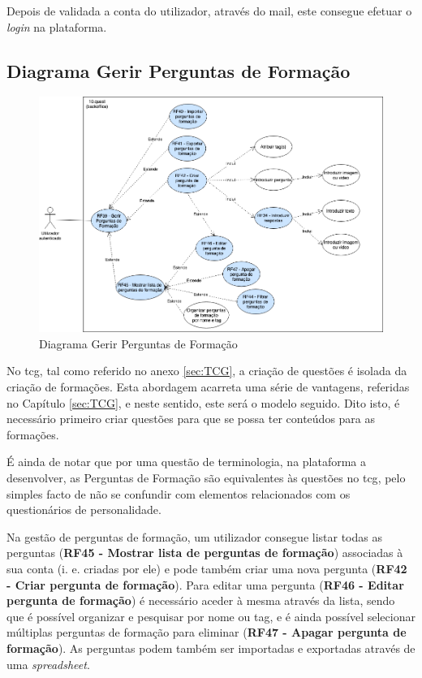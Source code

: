 Depois de validada a conta do utilizador, através do mail, este consegue efetuar o \textit{login} na plataforma.



\newpage

\subsection{Diagrama Gerir Perguntas de Formação}
\label{d:perguntastcg}
\begin{figure}[ht!]
	\begin{center}
		\includegraphics[width=1\textwidth]{img/rf/gerir-perguntas-tcg}
		\caption{Diagrama Gerir Perguntas de Formação}
		\label{fig:rf-gerir-perguntas-tcg}
	\end{center}
\end{figure}

No \acrshort{tcg}, tal como referido no anexo \ref{sec:TCG}, a criação de questões é isolada da criação de formações. Esta abordagem acarreta uma série de vantagens, referidas no Capítulo \ref{sec:TCG}, e neste sentido, este será o modelo seguido. Dito isto, é necessário primeiro criar questões para que se possa ter conteúdos para as formações. 

É ainda de notar que por uma questão de terminologia, na plataforma a desenvolver, as Perguntas de Formação são equivalentes às questões no \acrshort{tcg}, pelo simples facto de não se confundir com elementos relacionados com os questionários de personalidade.

Na gestão de perguntas de formação, um utilizador consegue listar todas as perguntas (\textbf{RF45 - Mostrar lista de perguntas de formação}) associadas à sua conta (i. e. criadas por ele) e pode também criar uma nova pergunta (\textbf{RF42 - Criar pergunta de formação}). Para editar uma pergunta (\textbf{RF46 - Editar pergunta de formação}) é necessário aceder à mesma através da lista, sendo que é possível organizar e pesquisar por nome ou tag, e é ainda possível selecionar múltiplas perguntas de formação para eliminar (\textbf{RF47 - Apagar pergunta de formação}). As perguntas podem também ser importadas e exportadas através de uma \textit{spreadsheet}.

